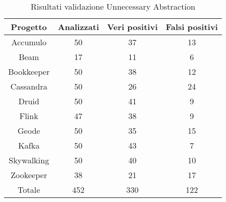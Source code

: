         \begin{table}[h]
        \centering
        \begin{tabular}{|c|c|c|c|}
            \hline
            \textbf{Progetto} & \textbf{Analizzati} & \textbf{Veri positivi} & \textbf{Falsi positivi} \\
            \hline
            Accumulo & 50 & 37 & 13 \\
            Beam & 17 & 11 & 6 \\
            Bookkeeper & 50 & 38 & 12 \\
            Cassandra & 50 & 26 & 24 \\
            Druid & 50 & 41 & 9 \\
            Flink & 47 & 38 & 9 \\
            Geode & 50 & 35 & 15 \\
            Kafka & 50 & 43 & 7 \\
            Skywalking & 50 & 40 & 10 \\
            Zookeeper & 38 & 21 & 17 \\
            \hline
            Totale & 452 & 330 & 122 \\
            \hline
        \end{tabular}
        \caption{Risultati validazione Unnecessary Abstraction}
        \label{tab:caption} 
        \end{table}